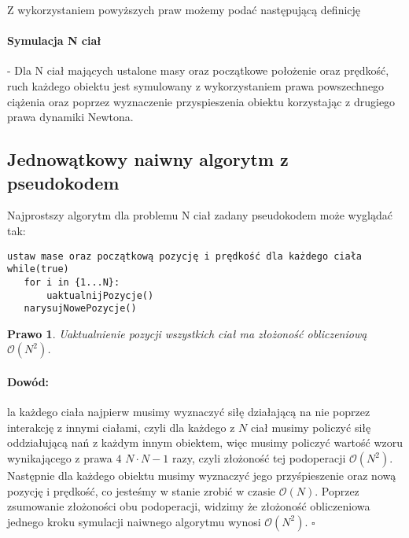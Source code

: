 \documentclass[14pt,twoside,a4paper]{article}
\newtheorem{theorem}{Prawo}
\newenvironment{myproof}[2] {\paragraph{Dowód:}}{\hfill$\square$}
\newcommand\tab[1][1cm]{\hspace*{#1}}
\begin{document}
Z wykorzystaniem powyższych praw możemy podać następującą definicję
\paragraph{Symulacja N ciał} -  Dla N ciał mających ustalone masy oraz początkowe położenie oraz prędkość, ruch każdego obiektu jest symulowany z wykorzystaniem prawa powszechnego ciążenia oraz poprzez wyznaczenie przyspieszenia obiektu korzystając z drugiego prawa dynamiki Newtona.

\subsection{\Large Jednowątkowy naiwny algorytm z pseudokodem}

Najprostszy algorytm dla problemu N ciał zadany pseudokodem może wyglądać tak:\\


\begin{lstlisting}[frame=single, framerule=2pt, caption=pseudokod]
ustaw mase oraz początkową pozycję i prędkość dla każdego ciała
while(true)
   for i in {1...N}:
       uaktualnijPozycje()
   narysujNowePozycje()
\end{lstlisting}

\begin{theorem}
Uaktualnienie pozycji wszystkich ciał ma złożoność obliczeniową $\mathcal{O}(N^{2})$.
\end{theorem}

\begin{myproof}

\tab Dla każdego ciała najpierw musimy wyznaczyć siłę działającą na nie poprzez interakcję z innymi ciałami, czyli dla każdego z $N$ ciał musimy policzyć siłę oddziałującą nań z każdym innym obiektem, więc musimy policzyć wartość wzoru wynikającego z prawa $4$ $N\cdot N-1$ razy, czyli złożoność tej podoperacji $\mathcal{O}(N^{2})$. 
Następnie dla każdego obiektu musimy wyznaczyć jego przyśpieszenie oraz nową pozycję i prędkość, co jesteśmy w stanie zrobić w czasie $\mathcal{O}(N)$.
Poprzez zsumowanie złożoności obu podoperacji, widzimy że złożoność obliczeniowa jednego kroku symulacji naiwnego algorytmu wynosi $\mathcal{O}(N^{2})$.
\end{myproof}
\end{document}
